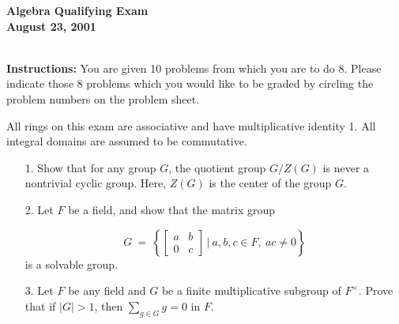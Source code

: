 \documentclass{article}
\begin{document}
\begin{Large}

\begin{center}\begin{LARGE}
{\bf  Algebra Qualifying Exam}\\ 
{\bf August 23, 2001}\\ \end{LARGE}
\end{center}
\vspace{0.1in}
\noindent\hrulefill\\
{\bf Instructions:} You are given 10 problems from which you are to do 8.
 Please indicate those  8 problems which you would like  to be graded 
by circling the problem numbers on the  problem sheet. 

 All rings on this exam are associative and
have multiplicative identity 1. All  integral domains are 
assumed to be commutative.
\vspace{0.2in}

\vs



\def\bC{\mathbb C}
\def\Q{\mathbb Q}
\def\Z{\mathbb Z}
\def\F{\mathbb F}
\def\Gal{\operatorname{Gal}}
\def\Aut{\operatorname{Aut}}
\def\<{\langle}
\def\>{\rangle}


\vspace{0.2in}

\begin{itemize}
 \item[1.] Show that for any group  $ G $, the quotient group 
$G/Z(G) $ is never a nontrivial cyclic group. Here, $ Z(G) $ is the center of the group $ G $.

\item[2.] Let $F$ be a field, and show that the matrix group

$$G\ =\ \left\lbrace\left[\begin{array}{cc}a & b\\0 & c\end{array}\right]\,|\ a,b,c\in F, \ 
ac\not=0\right\rbrace$$
is a solvable group.

\item[3.] Let $F$ be any field and $ G$ be a finite  multiplicative subgroup 
of $ F^{\times}$. Prove that if $  |G|>1 $, then 
$ \sum_{g \in G} g = 0 $ in $F$.



\end{itemize}
\end{Large}
\end{document}
